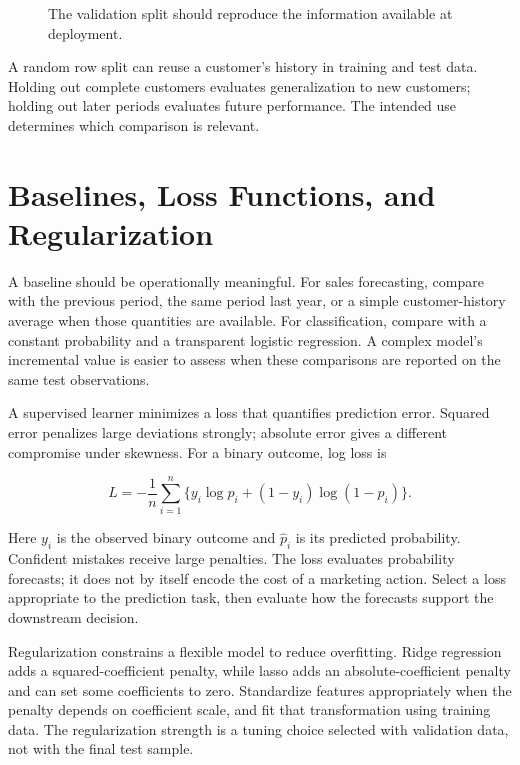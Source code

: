 \begin{figure}[htbp]
\centering

\caption{The validation split should reproduce the information available at deployment.}\label{fig:M07_splits}
\end{figure}

A random row split can reuse a customer's history in training and test
data. Holding out complete customers evaluates generalization to new
customers; holding out later periods evaluates future performance. The
intended use determines which comparison is relevant.

\hypertarget{M07-baselines-loss-functions-and-regularization}{%
\section{Baselines, Loss Functions, and
Regularization}\label{M07-baselines-loss-functions-and-regularization}}

\noindent A baseline should be operationally meaningful. For sales forecasting,
compare with the previous period, the same period last year, or a simple
customer-history average when those quantities are available. For
classification, compare with a constant probability and a transparent
logistic regression. A complex model's incremental value is easier to
assess when these comparisons are reported on the same test
observations.

A supervised learner minimizes a loss that quantifies prediction error.
Squared error penalizes large deviations strongly; absolute error gives
a different compromise under skewness. For a binary outcome, log loss is

\[
L=-\frac{1}{n}\sum_{i=1}^n\{y_i\log\hat p_i+(1-y_i)\log(1-\hat p_i)\}.
\]

Here \(y_i\) is the observed binary outcome and \(\hat p_i\) is its
predicted probability. Confident mistakes receive large penalties. The
loss evaluates probability forecasts; it does not by itself encode the
cost of a marketing action. Select a loss appropriate to the prediction
task, then evaluate how the forecasts support the downstream decision.

Regularization constrains a flexible model to reduce overfitting. Ridge
regression adds a squared-coefficient penalty, while lasso adds an
absolute-coefficient penalty and can set some coefficients to zero.
Standardize features appropriately when the penalty depends on
coefficient scale, and fit that transformation using training data. The
regularization strength is a tuning choice selected with validation
data, not with the final test sample.

